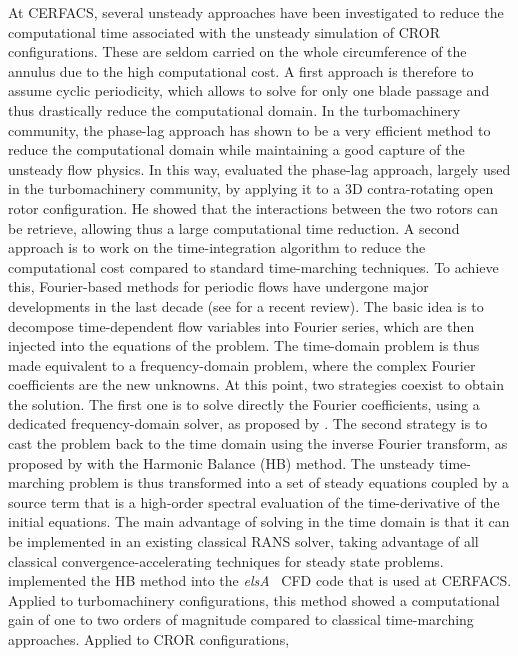 At CERFACS, several unsteady approaches have been investigated 
to reduce the computational time associated with the unsteady simulation of 
CROR configurations. 
These are seldom carried on the whole
circumference of the annulus due to the high computational
cost. A first approach is therefore to assume cyclic periodicity,
which allows to solve for only one blade passage and thus drastically
reduce the computational domain. 
In the turbomachinery community, the phase-lag approach has shown to be
a very efficient method to reduce the computational domain while
maintaining a good capture of the unsteady flow physics. 
In this way, \citet{Burnazzi2010} evaluated the phase-lag approach, largely
used in the turbomachinery community, by applying it
to a 3D contra-rotating open rotor configuration. He showed
that the interactions between the two rotors can be retrieve, allowing
thus a large computational time reduction.
A second approach 
is to work on the time-integration algorithm to reduce
the computational cost compared to standard time-marching techniques. To achieve
this, Fourier-based methods for periodic flows have undergone major
developments in the last decade (see \citet{He2010} for a recent
review).  The basic idea is to decompose
time-dependent flow variables into Fourier series, which are then
injected into the equations of the problem. The time-domain problem is
thus made equivalent to a frequency-domain problem, where the complex
Fourier coefficients are the new unknowns. At this point, two
strategies coexist to obtain the solution. The first one is to solve
directly the Fourier coefficients, using a dedicated
frequency-domain solver, as proposed by \citet{He1998}. The second strategy is to cast the
problem back to the time domain using the inverse Fourier transform, as
proposed by \citet{Hall2002} with the Harmonic
Balance (HB) method. The unsteady time-marching problem is thus
transformed into a set of steady equations coupled by a source term
that is a high-order spectral evaluation of the time-derivative of the
initial equations. The main advantage of solving in the time domain is
that it can be implemented in an existing classical RANS solver,
taking advantage of all classical convergence-accelerating techniques
for steady state problems.
\citet{ThesisSicot} implemented
the HB method into the \textit{elsA}~\cite{Cambier2013} CFD code
that is used at CERFACS. Applied to turbomachinery
configurations, this method showed a computational gain
of one to two orders of magnitude 
compared to classical time-marching approaches.
Applied to CROR configurations, \citet{Yabili2010}
